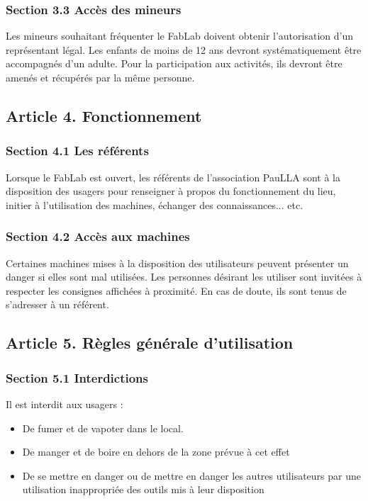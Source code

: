 \subsubsection*{Section 3.3 Accès des mineurs}
Les mineurs souhaitant fréquenter le FabLab doivent obtenir l'autorisation d'un représentant légal. Les enfants de moins de 12 ans devront systématiquement être accompagnés d'un adulte. Pour la participation aux activités, ils devront être amenés et récupérés par la même personne.

\subsection*{Article 4. Fonctionnement}
\subsubsection*{Section 4.1 Les référents}
Lorsque le FabLab est ouvert, les référents de l'association PauLLA sont à la disposition des usagers pour renseigner à propos du fonctionnement du lieu, initier à l'utilisation des machines, échanger des connaissances... etc.
\subsubsection*{Section 4.2 Accès aux machines}
Certaines machines mises à la disposition des utilisateurs peuvent présenter un danger si elles sont mal utilisées. Les personnes désirant les utiliser sont invitées à respecter les consignes affichées à proximité. En cas de doute, ils sont tenus de s'adresser à un référent.

\subsection*{Article 5. Règles générale d'utilisation}
\subsubsection*{Section 5.1 Interdictions}
Il est interdit aux usagers :
\begin{itemize}
  \item De fumer et de vapoter dans le local.
  \item De manger et de boire en dehors de la zone prévue à cet effet
  \item De se mettre en danger ou de mettre en danger les autres utilisateurs par une utilisation inappropriée des outils mis à leur disposition
\end{itemize}
